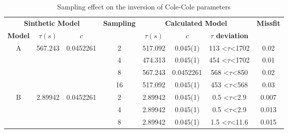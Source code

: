 \documentclass{vie16}
\begin{document}
\begin{table}[H]
\centering
\caption{Sampling effect on the inversion of Cole-Cole parameters}
\label{t:INV-sample_effect}
\begin{adjustbox}{scale=0.9}
\begin{tabular}{@{}|c|c|c|c|c|c|c|c|@{}}
\multicolumn{3}{|c|}{\textbf{Sinthetic Model}}                             & \multirow{2}{*}{\textbf{Sampling}} & \multicolumn{3}{c|}{\textbf{Calculated Model}}                          & \multirow{2}{*}{\textbf{Missfit}}    \\
\textbf{Model}     & \textbf{$\tau (s)$}          & \textbf{$c$}
&                                    & \textbf{$\tau (s)$} & \textbf{$c$} & \textbf{$\tau$ deviation}         &                                      \\ \hline
\multirow{4}{*}{A} & \multirow{4}{*}{567.243} & \multirow{4}{*}{0.0452261} & 2                                  & 517.092         & 0.045(1)          & 113 \textless$\tau$\textless 1702 & 0.02                                 \\
                   &                          &                            & 4                                  & 474.313         & 0.045(1)          & 454 \textless$\tau$\textless 1702 & 0.01                                 \\
                   &                          &                            & 8                                  & 567.243         & 0.0452261         & 568 \textless$\tau$\textless 850  & 0.02                                 \\
                   &                          &                            & 16                                 & 517.092         & 0.045(1)          & 453 \textless$\tau$\textless 568  & 0.03                                 \\ \hline
\multirow{4}{*}{B} & \multirow{4}{*}{2.89942} & \multirow{4}{*}{0.0452261} & 2                                  & 2.89942         & 0.045(1)          & 0.5 \textless$\tau$\textless 2.9  & 0.007                                \\
                   &                          &                            & 4                                  & 2.89942         & 0.045(1)          & 0.5 \textless$\tau$\textless 2.9  & 0.013                                \\
                   &                          &                            & 8                                  & 2.89942         & 0.045(1)          & 1.5 \textless$\tau$\textless 11.6 & 0.015                                \\

\end{tabular}
\end{adjustbox}
\end{table}
\end{document}
